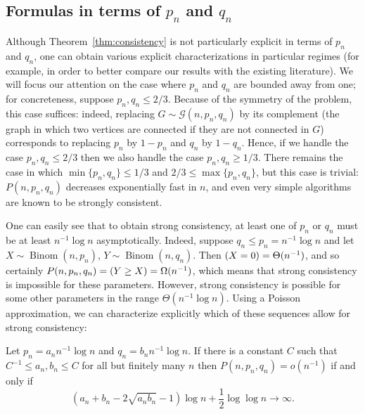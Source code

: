 \documentclass[EJP]{ejpecp}
\newcommand{\1}[1]{\mathbbm{1}_{\{#1\}}}
\newcommand{\calG}{\mathcal{G}}
\let\Pr\relax
\DeclareMathOperator{\Pr}{Pr}
\DeclareMathOperator{\Binom}{Binom}
\begin{document}
\subsection{Formulas in terms of $p_n$ and $q_n$}\label{sec:explicit}
Although Theorem~\ref{thm:consistency} is not particularly explicit
in terms of $p_n$ and $q_n$,
one can obtain various explicit characterizations
in particular regimes (for example, in order to better compare our results
with the existing literature).
We will focus our attention on the case where $p_n$ and $q_n$ are bounded
away from one; for concreteness, suppose $p_n, q_n \le 2/3$. Because of the
symmetry of the problem, this case suffices: 
indeed, replacing $G \sim \calG(n, p_n, q_n)$ by
its complement (the graph in which two vertices are connected if they are
not connected in $G$) corresponds to replacing $p_n$ by $1-p_n$ and $q_n$
by $1-q_n$. Hence, if we handle the case $p_n, q_n \le 2/3$ then we also
handle the case $p_n, q_n \ge 1/3$. There remains the case in which
$\min\{p_n, q_n\} \le 1/3$ and $2/3 \le \max\{p_n, q_n\}$, but this case is
trivial: $P(n, p_n, q_n)$ decreases exponentially fast in $n$, and even very
simple algorithms are known to be strongly consistent.


One can easily see that to obtain strong consistency, at least one of
$p_n$ or $q_n$ must be at least $n^{-1} \log n$ asymptotically. Indeed,
suppose $q_n \le p_n = n^{-1} \log n$ and let $X \sim \Binom(n, p_n)$, $Y \sim \Binom(n, q_n)$. Then $\Pr(X = 0) = \Theta(n^{-1})$, and so
certainly $P(n, p_n, q_n) = \Pr(Y \ge X) = \Omega(n^{-1})$,
which means that strong consistency is impossible for these parameters.
However, strong consistency is possible for some other parameters
in the range $\Theta(n^{-1} \log n)$. Using a Poisson approximation,
we can characterize explicitly which of these sequences allow for
strong consistency:
\begin{proposition}\label{prop:explicit-sparse}
    Let $p_n = a_n n^{-1} \log n$ and $q_n = b_n n^{-1} \log n$.
    If there is a constant $C$ such that $C^{-1} \le a_n, b_n \le C$ for all but
    finitely many $n$ then $P(n, p_n, q_n) = o(n^{-1})$ if and only if
\[
 (a_n + b_n - 2 \sqrt{a_n b_n} - 1) \log n + \frac 12 \log \log n \to
 \infty.
\]
\end{proposition}
\end{document}
